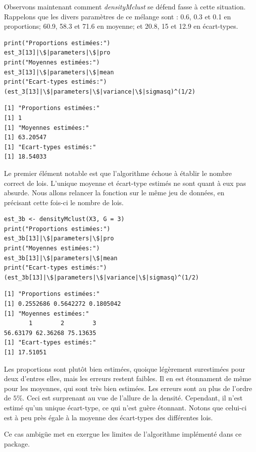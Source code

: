 \documentclass[frenchb]{report}
\newcommand{\1}{\mathbbm{1}}
\theoremstyle{definition}\newtheorem{defn}{Définition}
\theoremstyle{definition}\newtheorem{exm}{Exemple}
\theoremstyle{definition}\newtheorem{nota}{Notation}
\theoremstyle{definition}\newtheorem{rem}{Remarque}
\begin{document}
\begin{appendices}
Observons maintenant comment \textit{densityMclust} se défend fasse à cette situation. \newline
Rappelons que les divers paramètres de ce mélange sont : 0.6, 0.3 et 0.1 en proportions; 60.9, 58.3 et 71.6 en moyenne; et 20.8, 15 et 12.9 en écart-types.
\begin{lstlisting}
print("Proportions estimées:")
est_3[13]|\$|parameters|\$|pro
print("Moyennes estimées:")
est_3[13]|\$|parameters|\$|mean
print("Ecart-types estimés:")
(est_3[13]|\$|parameters|\$|variance|\$|sigmasq)^(1/2)
\end{lstlisting}

\begin{verbatim}
[1] "Proportions estimées:"
[1] 1
[1] "Moyennes estimées:"
[1] 63.20547
[1] "Ecart-types estimés:"
[1] 18.54033
\end{verbatim}
Le premier élément notable est que l'algorithme échoue à établir le nombre correct de lois. L'unique moyenne et écart-type estimés ne sont quant à eux pas absurde. \newline
%
Nous allons relancer la fonction sur le même jeu de données, en précisant cette fois-ci le nombre de lois.
\begin{lstlisting}
est_3b <- densityMclust(X3, G = 3)
print("Proportions estimées:")
est_3b[13]|\$|parameters|\$|pro
print("Moyennes estimées:")
est_3b[13]|\$|parameters|\$|mean
print("Ecart-types estimés:")
(est_3b[13]|\$|parameters|\$|variance|\$|sigmasq)^(1/2)
\end{lstlisting}
\begin{verbatim}
[1] "Proportions estimées:"
[1] 0.2552686 0.5642272 0.1805042
[1] "Moyennes estimées:"
       1        2        3 
56.63179 62.36268 75.13635 
[1] "Ecart-types estimés:"
[1] 17.51051
\end{verbatim}

Les proportions sont plutôt bien estimées, quoique légèrement surestimées pour deux d'entres elles, mais les erreurs restent faibles. Il en est étonnament de même pour les moyennes, qui sont très bien estimées. Les erreurs sont au plus de l'ordre de $5\%$. Ceci est surprenant au vue de l'allure de la densité. Cependant, il n'est estimé qu'un unique écart-type, ce qui n'est guère étonnant. Notons que celui-ci est à peu près égale à la moyenne des écart-types des différentes lois. \newline

Ce cas ambigüe met en exergue les limites de l'algorithme implémenté dans ce package.


\end{appendices}
\end{document}
